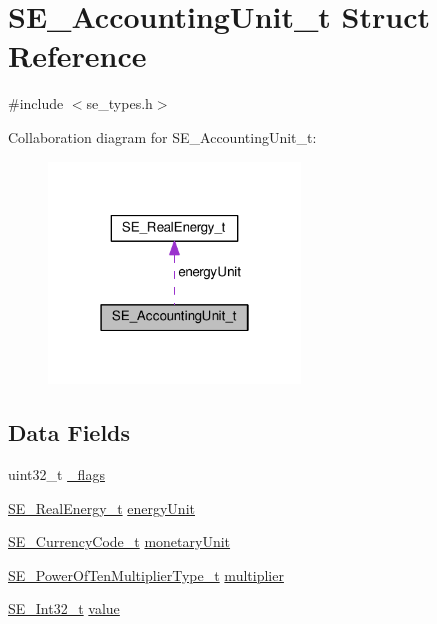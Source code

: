 \hypertarget{structSE__AccountingUnit__t}{}\section{S\+E\+\_\+\+Accounting\+Unit\+\_\+t Struct Reference}
\label{structSE__AccountingUnit__t}


{\ttfamily \#include $<$se\+\_\+types.\+h$>$}



Collaboration diagram for S\+E\+\_\+\+Accounting\+Unit\+\_\+t\+:\nopagebreak
\begin{figure}[H]
\begin{center}
\leavevmode
\includegraphics[width=190pt]{structSE__AccountingUnit__t__coll__graph}
\end{center}
\end{figure}
\subsection*{Data Fields}
\begin{DoxyCompactItemize}
\item 
uint32\+\_\+t \hyperlink{group__AccountingUnit_ga955b8d2446e61fde2b55b98207719d4e}{\+\_\+flags}
\item 
\hyperlink{structSE__RealEnergy__t}{S\+E\+\_\+\+Real\+Energy\+\_\+t} \hyperlink{group__AccountingUnit_gaaa1abdf6bb3cb5cda82403e02c17136b}{energy\+Unit}
\item 
\hyperlink{group__CurrencyCode_gadef02433fe757d7bd9fd0d9b59f690a0}{S\+E\+\_\+\+Currency\+Code\+\_\+t} \hyperlink{group__AccountingUnit_ga3dcc7761e45b6e3b62acb258997ba854}{monetary\+Unit}
\item 
\hyperlink{group__PowerOfTenMultiplierType_gaf0317b781dc8dbb9cb6ac4e44a14fdef}{S\+E\+\_\+\+Power\+Of\+Ten\+Multiplier\+Type\+\_\+t} \hyperlink{group__AccountingUnit_ga56b43f2fc79c97ad77b7809ea172d72f}{multiplier}
\item 
\hyperlink{group__Int32_gaa7afc819cfc8033c5fa408e34da8b71a}{S\+E\+\_\+\+Int32\+\_\+t} \hyperlink{group__AccountingUnit_ga3c90f530724e607bdb4b133c0fae9df4}{value}
\end{DoxyCompactItemize}



